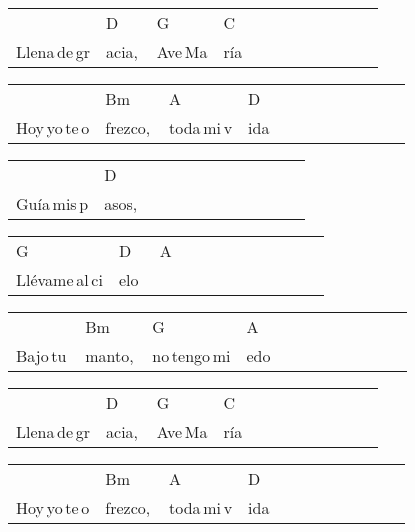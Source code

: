 \begin{multicols}{2}
\noindent
\begin{tabular}{llllllllllll}
&D&G&C\\
Llena\,de\,gr&acia,\,&Ave\,Ma&ría
\end{tabular}

\noindent
\begin{tabular}{llllllllllll}
&Bm&A&D\\
Hoy\,yo\,te\,o&frezco,\,&toda\,mi\,v&ida
\end{tabular}


\noindent
\noindent
\begin{tabular}{llllllllllll}
&D\\
Guía\,mis\,p&asos,
\end{tabular}

\noindent
\begin{tabular}{llllllllllll}
G&D&A\\
Llévame\,al\,ci&elo\,\,&
\end{tabular}

\noindent
\begin{tabular}{llllllllllll}
&Bm&G&A\\
Bajo\,tu\,&manto,\,&no\,tengo\,mi&edo
\end{tabular}

\noindent
\begin{tabular}{llllllllllll}
&D&G&C\\
Llena\,de\,gr&acia,\,&Ave\,Ma&ría
\end{tabular}

\noindent
\begin{tabular}{llllllllllll}
&Bm&A&D\\
Hoy\,yo\,te\,o&frezco,\,&toda\,mi\,v&ida
\end{tabular}

\end{multicols}